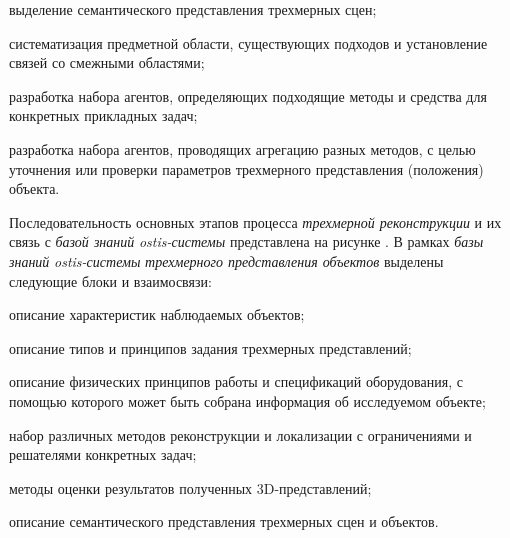 \begin{textitemize}
    \item выделение семантического представления трехмерных сцен;
    \item систематизация предметной области, существующих подходов и установление связей со смежными областями;
    \item разработка набора агентов, определяющих подходящие методы и средства для конкретных прикладных задач;
    \item разработка набора агентов, проводящих агрегацию разных методов, с целью уточнения или проверки параметров трехмерного представления (положения) объекта.
\end{textitemize}

Последовательность основных этапов процесса \textit{трехмерной реконструкции} и их связь с \textit{базой знаний} \textit{ostis-системы} представлена на рисунке \textit{}. В рамках \textit{базы знаний} \textit{ostis-системы} \textit{трехмерного представления объектов} выделены следующие блоки и взаимосвязи:

\begin{textitemize}
    \item описание характеристик наблюдаемых объектов;
    \item описание типов и принципов задания трехмерных представлений;
    \item описание физических принципов работы и спецификаций оборудования, с помощью которого может быть собрана информация об исследуемом объекте;
    \item набор различных методов реконструкции и локализации с ограничениями и решателями конкретных задач;
    \item методы оценки результатов полученных 3D-представлений;
    \item описание семантического представления трехмерных сцен и объектов.
\end{textitemize}


